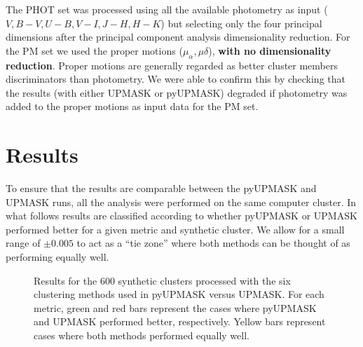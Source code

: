 \documentclass{aa}
\begin{document}

 The PHOT set was processed using all the available photometry as input ($V,
 B-V, U-B, V-I, J-H, H-K$) but selecting only the four principal dimensions
 after the principal component analysis dimensionality reduction.
 For the PM set we used the proper motions ($\mu_{\alpha}, \mu{\delta}$),
 \textbf{with no dimensionality reduction}. Proper motions are generally
 regarded as better cluster members discriminators than photometry. We were
 able to confirm this by checking that the results (with either UPMASK or
 pyUPMASK) degraded if photometry was added to the proper motions as input
 data for the PM set.




\section{Results}
 \label{sec:results}

 To ensure that the results are comparable between the pyUPMASK and UPMASK runs,
 all the analysis were performed on the same computer cluster. In what follows
 results are classified according to whether pyUPMASK or UPMASK performed
 better for a given metric and synthetic cluster.
 We allow for a small range of $\pm0.005$ to act as a ``tie zone''
 where both methods can be thought of as performing equally well.\\

 \begin{figure}
 \caption{Results for the 600 synthetic clusters processed with the six
 clustering methods used in pyUPMASK versus UPMASK. For each metric, green and
 red bars represent the cases where pyUPMASK and UPMASK performed better,
 respectively. Yellow bars represent cases where both methods performed
 equally well.}
 \label{fig:allmethods}
 \end{figure}
\end{document}
